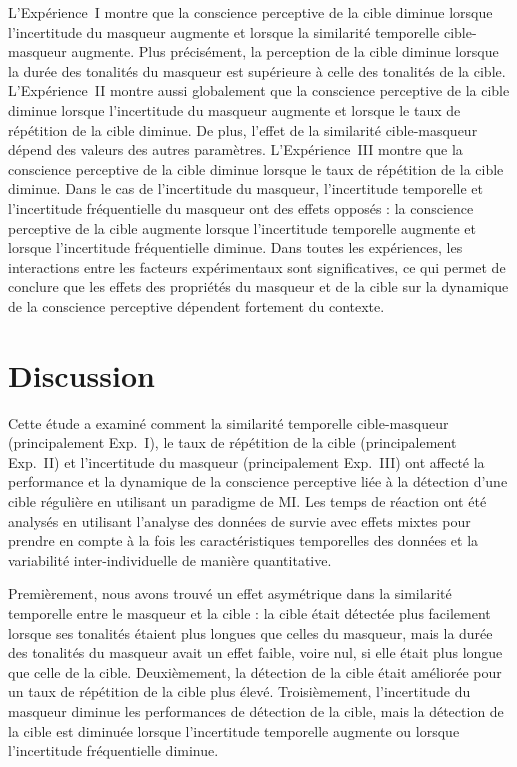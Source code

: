 L'Expérience~I montre que la conscience perceptive de la cible diminue lorsque l'incertitude du masqueur augmente et lorsque la similarité temporelle cible-masqueur augmente. 
Plus précisément, la perception de la cible diminue lorsque la durée des tonalités du masqueur est supérieure à celle des tonalités de la cible. 
L'Expérience~II montre aussi globalement que la conscience perceptive de la cible diminue lorsque l'incertitude du masqueur augmente et lorsque le taux de répétition de la cible diminue. 
De plus, l'effet de la similarité cible-masqueur dépend des valeurs des autres paramètres. 
L'Expérience~III montre que la conscience perceptive de la cible diminue lorsque le taux de répétition de la cible diminue. 
Dans le cas de l'incertitude du masqueur, l'incertitude temporelle et l'incertitude fréquentielle du masqueur ont des effets opposés : la conscience perceptive de la cible augmente lorsque l'incertitude temporelle augmente et lorsque l'incertitude fréquentielle diminue. 
Dans toutes les expériences, les interactions entre les facteurs expérimentaux sont significatives, ce qui permet de conclure que les effets des propriétés du masqueur et de la cible sur la dynamique de la conscience perceptive dépendent fortement du contexte.

\section{Discussion}
\label{chapitre4discussion}

Cette étude a examiné comment la similarité temporelle cible-masqueur (principalement Exp.~I), le taux de répétition de la cible (principalement Exp.~II) et l'incertitude du masqueur (principalement Exp.~III) ont affecté la performance et la dynamique de la conscience perceptive liée à la détection d'une cible régulière en utilisant un paradigme de MI. 
Les temps de réaction ont été analysés en utilisant l'analyse des données de survie avec effets mixtes pour prendre en compte à la fois les caractéristiques temporelles des données et la variabilité inter-individuelle de manière quantitative. 

Premièrement, nous avons trouvé un effet asymétrique dans la similarité temporelle entre le masqueur et la cible : la cible était détectée plus facilement lorsque ses tonalités étaient plus longues que celles du masqueur, mais la durée des tonalités du masqueur avait un effet faible, voire nul, si elle était plus longue que celle de la cible. 
Deuxièmement, la détection de la cible était améliorée pour un taux de répétition de la cible plus élevé. 
Troisièmement, l'incertitude du masqueur diminue les performances de détection de la cible, mais la détection de la cible est diminuée lorsque l'incertitude temporelle augmente ou lorsque l'incertitude fréquentielle diminue.

